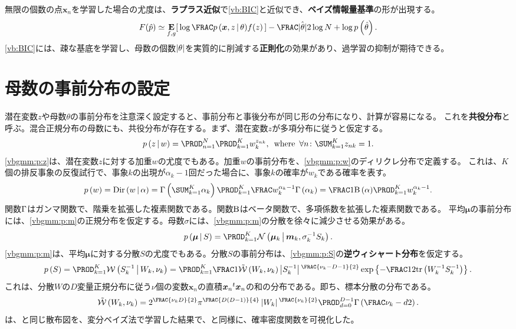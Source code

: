 \documentclass[10pt,a4paper]{book}
\begin{document}
%
無限の個数の点$\bm{x}_n$を学習した場合の尤度は、\textbf{ラプラス近似}で\eqref{vb:BIC}と近似でき、\textbf{ベイズ情報量基準}の形が出現する。
%
\begin{equation}
\label{eq:vb:BIC}
F(\hatp) \simeq
\E[f,g]{\log \frac{\prob{\bm{x},z}[\theta]}{f(z)}} - \frac{\hat{\abs{\theta}}}{2} \log N + \log \prob{\hat{\theta}}.
\end{equation}
%
\eqref{vb:BIC}には、疎な基底を学習し、母数の個数$\abs{\theta}$を実質的に削減する\textbf{正則化}の効果があり、過学習の抑制が期待できる。

\section{母数の事前分布の設定\label{sect:vbgmm}}

潜在変数$z$や母数$\theta$の事前分布を注意深く設定すると、事前分布と事後分布が同じ形の分布になり、計算が容易になる。
これを\textbf{共役分布}と呼ぶ。混合正規分布の母数にも、共役分布が存在する。まず、潜在変数$z$が多項分布に従うと仮定する。
%
\begin{equation}
\label{eq:vbgmm:p:z}
\prob{z}[w] = \prod_{n=1}^N \prod_{k=1}^K w_k^{z_{nk}},
\where
\forall n\colon
\sum_{k=1}^K z_{nk} = 1.
\end{equation}
%
\eqref{vbgmm:p:z}は、潜在変数$z$に対する加重$w$の尤度でもある。加重$w$の事前分布を、\eqref{vbgmm:p:w}のディリクレ分布で定義する。
これは、$K$個の排反事象の反復試行で、事象$k$の出現が$\alpha_k-1$回だった場合に、事象$k$の確率が$w_k$である確率を表す。
%
\begin{equation}
\label{eq:vbgmm:p:w}
\prob{w} = \Dd{w}{\alpha} =
\Gd{\sum_{k=1}^K \alpha_k} \prod_{k=1}^K \frac{w_k^{\alpha_k-1}}{\Gd{\alpha_k}} =
\frac{1}{\Bd{\alpha}} \prod_{k=1}^K w_k^{\alpha_k-1}.
\end{equation}
%
関数$\Gamma$はガンマ関数で、階乗を拡張した複素関数である。関数$\mathrm{B}$はベータ関数で、多項係数を拡張した複素関数である。
平均$\bm{\mu}$の事前分布には、\eqref{vbgmm:p:m}の正規分布を仮定する。母数$\sigma$には、\eqref{vbgmm:p:m}の分散を徐々に減少させる効果がある。
%
\begin{equation}
\label{eq:vbgmm:p:m}
\prob{\bm{\mu}}[S] = \prod_{k=1}^K \Nd{\bm{\mu}_k}{\bm{m}_k,\sigma_k^{-1} S_k}.
\end{equation}
%
\eqref{vbgmm:p:m}は、平均$\bm{\mu}$に対する分散$S$の尤度でもある。分散$S$の事前分布は、\eqref{vbgmm:p:S}の\textbf{逆ウィシャート分布}を仮定する。
%
\begin{equation}
\label{eq:vbgmm:p:S}
\prob{S} =
\prod_{k=1}^K \Wd{S_k^{-1}}{W_k,\nu_k} =
\prod_{k=1}^K \frac{1}{\Wn{W_k,\nu_k}} \abs{S_k^{-1}}^{\FRAC{\nu_k-D-1}{2}} \exp\seq{-\frac{1}{2}\trace{W_k^{-1}S_k^{-1}}}.
\end{equation}
%
これは、分散$W$の$D$変量正規分布に従う$\nu$個の変数$\bm{x}_n$の直積$\bm{x}_n{}^t\bm{x}_n$の和の分布である。即ち、標本分散の分布である。
%
\begin{equation}
\Wn{W_k,\nu_k} = 2^{\FRAC{\nu_kD}{2}} \pi^{\FRAC{D(D-1)}{4}} \abs{W_k}^{\FRAC{\nu_k}{2}} \prod_{d=0}^{D-1} \Gd{\frac{\nu_k-d}{2}}.
\end{equation}
%
は、と同じ散布図を、変分ベイズ法で学習した結果で、と同様に、確率密度関数を可視化した。
\end{document}

